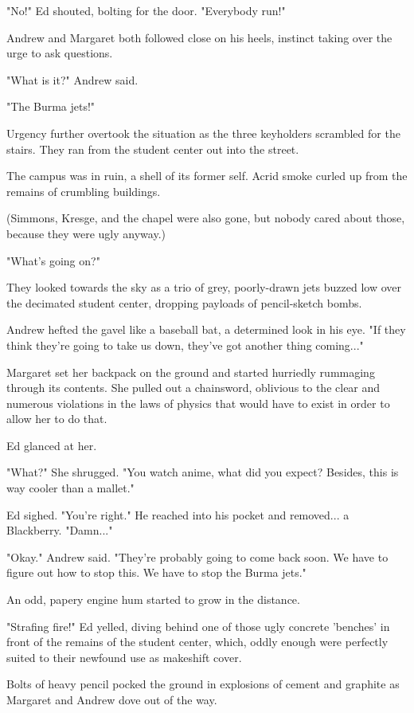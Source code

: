 \documentclass[10pt]{article}
\begin{document}
"No!" Ed shouted, bolting for the door. "Everybody run!"

Andrew and Margaret both followed close on his heels, instinct taking over the urge to ask questions.

"What is it?" Andrew said.

"The Burma jets!"

Urgency further overtook the situation as the three keyholders scrambled for the stairs. They ran from the student center out into the street.

The campus was in ruin, a shell of its former self. Acrid smoke curled up from the remains of crumbling buildings.

(Simmons, Kresge, and the chapel were also gone, but nobody cared about those, because they were ugly anyway.)

"What's going on?"

They looked towards the sky as a trio of grey, poorly-drawn jets buzzed low over the decimated student center, dropping payloads of pencil-sketch bombs.

Andrew hefted the gavel like a baseball bat, a determined look in his eye. "If they think they're going to take us down, they've got another thing coming..."

Margaret set her backpack on the ground and started hurriedly rummaging through its contents. She pulled out a chainsword, oblivious to the clear and numerous violations in the laws of physics that would have to exist in order to allow her to do that.

Ed glanced at her.

"What?" She shrugged. "You watch anime, what did you expect? Besides, this is way cooler than a mallet."

Ed sighed. "You're right." He reached into his pocket and removed... a Blackberry. "Damn..."

"Okay." Andrew said. "They're probably going to come back soon. We have to figure out how to stop this. We have to stop the Burma jets."

An odd, papery engine hum started to grow in the distance.

"Strafing fire!" Ed yelled, diving behind one of those ugly concrete 'benches' in front of the remains of the student center, which, oddly enough were perfectly suited to their newfound use as makeshift cover.

Bolts of heavy pencil pocked the ground in explosions of cement and graphite as Margaret and Andrew dove out of the way.
\end{document}
